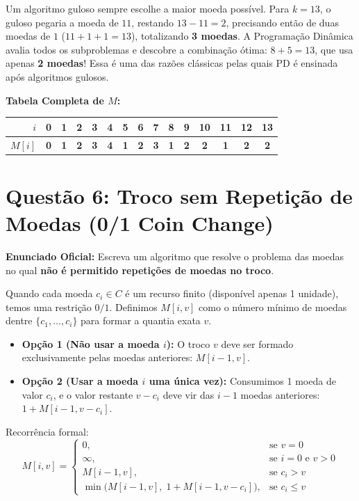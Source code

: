 \documentclass[11pt,a4paper]{article}
\begin{document}
\begin{alerta}
Um algoritmo guloso sempre escolhe a maior moeda possível. Para $k = 13$, o guloso pegaria a moeda de $11$, restando $13 - 11 = 2$, precisando então de duas moedas de $1$ ($11 + 1 + 1 = 13$), totalizando \textbf{3 moedas}.
A Programação Dinâmica avalia todos os subproblemas e descobre a combinação ótima: $8 + 5 = 13$, que usa apenas \textbf{2 moedas}! Essa é uma das razões clássicas pelas quais PD é ensinada após algoritmos gulosos.
\end{alerta}

\textbf{Tabela Completa de $M$:}
\begin{center}
\begin{tabular}{r|cccccccccccccc}
\toprule
$i$ & 0 & 1 & 2 & 3 & 4 & 5 & 6 & 7 & 8 & 9 & 10 & 11 & 12 & 13 \\
\midrule
$M[i]$ & \textbf{0} & \textbf{1} & \textbf{2} & \textbf{3} & \textbf{4} & \textbf{1} & \textbf{2} & \textbf{3} & \textbf{1} & \textbf{2} & \textbf{2} & \textbf{1} & \textbf{2} & \textbf{2} \\
\bottomrule
\end{tabular}
\end{center}

\vspace{0.4cm}

\section*{Questão 6: Troco sem Repetição de Moedas (0/1 Coin Change)}

\textbf{Enunciado Oficial:} Escreva um algoritmo que resolve o problema das moedas no qual \textbf{não é permitido repetições de moedas no troco}.

\begin{teoria}
Quando cada moeda $c_i \in C$ é um recurso finito (disponível apenas 1 unidade), temos uma restrição $0/1$.
Definimos $M[i, v]$ como o número mínimo de moedas dentre $\{c_1, \dots, c_i\}$ para formar a quantia exata $v$.
\begin{itemize}
    \item \textbf{Opção 1 (Não usar a moeda $i$):} O troco $v$ deve ser formado exclusivamente pelas moedas anteriores: $M[i-1, v]$.
    \item \textbf{Opção 2 (Usar a moeda $i$ uma única vez):} Consumimos 1 moeda de valor $c_i$, e o valor restante $v - c_i$ deve vir das $i-1$ moedas anteriores: $1 + M[i-1, v - c_i]$.
\end{itemize}
Recorrência formal:
\[
M[i, v] = 
\begin{cases}
0, & \text{se } v = 0 \\
\infty, & \text{se } i = 0 \text{ e } v > 0 \\
M[i-1, v], & \text{se } c_i > v \\
\min\Big( M[i-1, v], \; 1 + M[i-1, v - c_i] \Big), & \text{se } c_i \le v
\end{cases}
\]
\end{teoria}
\end{document}
